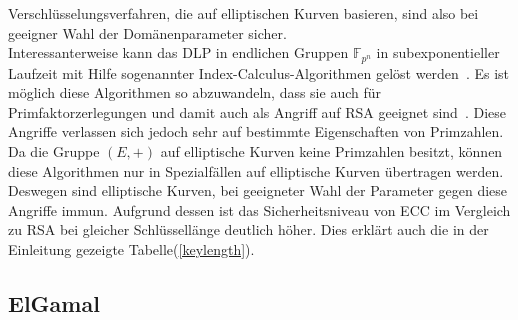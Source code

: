\documentclass[hidelinks]{article}
\theoremstyle{plain}
\theoremstyle{definition}
\theoremstyle{rem}
\begin{document}
\begin{sloppypar}
Verschlüsselungsverfahren, die auf elliptischen Kurven basieren, sind also bei geeigner Wahl der Domänenparameter sicher. \\
\newline
Interessanterweise kann das DLP in endlichen Gruppen $\mathbb{F}_{p^n}$ in subexponentieller Laufzeit mit Hilfe sogenannter Index-Calculus-Algorithmen gelöst werden~\cite{joux2014}. Es ist möglich diese Algorithmen so abzuwandeln, dass sie auch für Primfaktorzerlegungen und damit auch als Angriff auf RSA geeignet sind~\cite{joux2014}.
Diese Angriffe verlassen sich jedoch sehr auf bestimmte Eigenschaften von Primzahlen. Da die Gruppe $(E, +)$ auf elliptische Kurven keine Primzahlen besitzt, können diese Algorithmen nur in Spezialfällen auf elliptische Kurven übertragen werden. Deswegen sind elliptische Kurven, bei geeigneter Wahl der Parameter gegen diese Angriffe immun.
Aufgrund dessen ist das Sicherheitsniveau von ECC im Vergleich zu RSA bei gleicher Schlüssellänge deutlich höher. Dies erklärt auch die in der Einleitung gezeigte Tabelle(\ref{keylength}).

\subsection{ElGamal}

\end{sloppypar}
\end{document}
